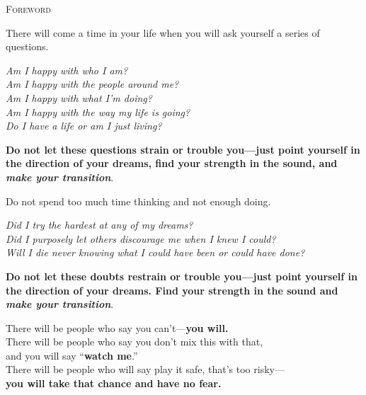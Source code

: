 \newpage
\thispagestyle{empty}

\vspace*{3cm}

\begin{center}
{\Large\textsc{Foreword}}
\end{center}

\vspace{2cm}

\begin{center}

There will come a time in your life when you will ask yourself a series of questions.

\vspace{1.2cm}
\textit{Am I happy with who I am?}\\
\textit{Am I happy with the people around me?}\\
\textit{Am I happy with what I'm doing?}\\
\textit{Am I happy with the way my life is going?}\\
\textit{Do I have a life or am I just living?}
\vspace{1.2cm}

\textbf{Do not let these questions strain or trouble you---just point yourself in the direction of your dreams, find your strength in the sound, and \emph{make your transition}}.

\vspace{2cm}

Do not spend too much time thinking and not enough doing.

\vspace{1.2cm}
\textit{Did I try the hardest at any of my dreams?}\\
\textit{Did I purposely let others discourage me when I knew I could?}\\
\textit{Will I die never knowing what I could have been or could have done?}
\vspace{1.2cm}

\textbf{Do not let these doubts restrain or trouble you---just point yourself in the direction of your dreams. Find your strength in the sound and \emph{make your transition}}.

\vspace{2.5cm}

There will be people who say you can't---\textbf{you will.}\\[0.8cm]
There will be people who say you don't mix this with that,\\
and you will say ``\textbf{watch me}.''\\[0.8cm]
There will be people who will say play it safe, that's too risky---\\
\textbf{you will take that chance and have no fear.}\\[1.5cm]


\end{center}
